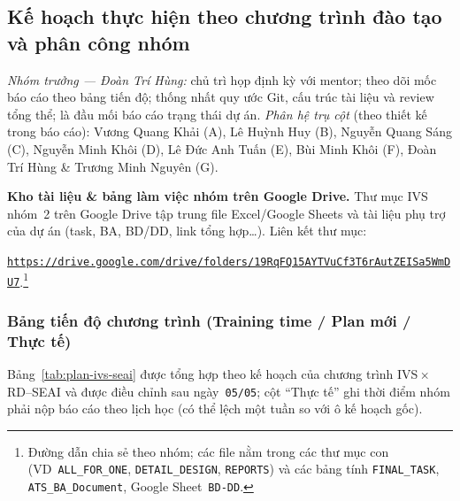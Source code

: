 \subsection{Kế hoạch thực hiện theo chương trình đào tạo và phân công nhóm}

\textit{Nhóm trưởng --- Đoàn Trí Hùng:} chủ trì họp định kỳ với mentor; theo dõi mốc báo cáo theo bảng tiến độ; thống nhất quy ước Git, cấu trúc tài liệu và review tổng thể; là đầu mối báo cáo trạng thái dự án. \textit{Phân hệ trụ cột} (theo thiết kế trong báo cáo): Vương Quang Khải (A), Lê Huỳnh Huy (B), Nguyễn Quang Sáng (C), Nguyễn Minh Khôi (D), Lê Đức Anh Tuấn (E), Bùi Minh Khôi (F), Đoàn Trí Hùng \& Trương Minh Nguyên (G).

\textbf{Kho tài liệu \& bảng làm việc nhóm trên Google Drive.} Thư mục IVS nhóm~2 trên Google Drive tập trung file Excel/Google Sheets và tài liệu phụ trợ của dự án (task, BA, BD/DD, link tổng hợp\ldots). Liên kết thư mục:

\href{https://drive.google.com/drive/folders/19RqFQ15AYTVuCf3T6rAutZEISa5WmDU7}{\texttt{https://drive.google.com/drive/folders/19RqFQ15AYTVuCf3T6rAutZEISa5WmDU7}}.\footnote{Đường dẫn chia sẻ theo nhóm; các file nằm trong các thư mục con (VD~\texttt{ALL\_FOR\_ONE}, \texttt{DETAIL\_DESIGN}, \texttt{REPORTS}) và các bảng tính \texttt{FINAL\_TASK}, \texttt{ATS\_BA\_Document}, Google Sheet~\texttt{BD-DD}.}

\subsubsection*{Bảng tiến độ chương trình (Training time / Plan mới / Thực tế)}
Bảng~\ref{tab:plan-ivs-seai} được tổng hợp theo kế hoạch của chương trình IVS\,\(\times\)\,RD--SEAI và được điều chỉnh sau ngày~\texttt{05/05}; cột ``Thực tế'' ghi thời điểm nhóm phải nộp báo cáo theo lịch học (có thể lệch một tuần so với ô kế hoạch gốc).

